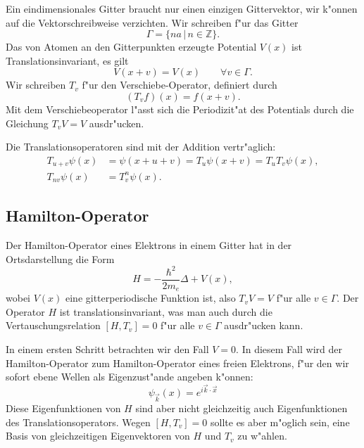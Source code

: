 Ein eindimensionales Gitter braucht nur einen einzigen Gittervektor,
wir k"onnen auf die Vektorschreibweise verzichten.
Wir schreiben f"ur das Gitter
\[
\Gamma=\{ na\,|\,n\in\mathbb Z\}.
\]
Das von Atomen an den Gitterpunkten erzeugte Potential $V(x)$
ist Translationsinvariant, es gilt
\[
V(x+v)=V(x)\qquad\forall v\in\Gamma.
\]
Wir schreiben $T_v$ f"ur den Verschiebe-Operator, definiert durch
\[
(T_vf)(x)=f(x+v).
\]
Mit dem Verschiebeoperator l"asst sich die Periodizit"at des Potentials
durch die Gleichung $T_vV=V$ ausdr"ucken.

Die Translationsoperatoren sind mit der Addition vertr"aglich:
\begin{align*}
T_{u+v}\psi(x)&=\psi(x+u+v)=T_u\psi(x+v)=T_uT_v\psi(x),\\
T_{nv}\psi(x)&=T_v^n\psi(x).
\end{align*}

\subsection{Hamilton-Operator}
Der Hamilton-Operator eines Elektrons in einem Gitter hat in der Ortsdarstellung
die Form
\[
H=-\frac{\hbar^2}{2m_e}\Delta + V(x),
\]
wobei $V(x)$ eine gitterperiodische Funktion ist, also $T_vV=V$ f"ur alle
$v\in\Gamma$.
Der Operator $H$ ist translationsinvariant, was man auch durch
die Vertauschungsrelation $[H,T_v]=0$ f"ur alle $v\in\Gamma$
ausdr"ucken kann.

In einem ersten Schritt betrachten wir den Fall $V=0$.
In diesem Fall wird der Hamilton-Operator zum Hamilton-Operator eines
freien Elektrons, f"ur den wir sofort ebene Wellen als Eigenzust"ande
angeben k"onnen:
\begin{equation}
\psi_{\vec k}(x)=e^{i\vec k\cdot \vec x}
\label{skript:ebenewelle}
\end{equation}
Diese Eigenfunktionen von $H$ sind aber nicht gleichzeitig auch
Eigenfunktionen des Translationsoperators. Wegen $[H,T_v]=0$
sollte es aber m"oglich sein, eine Basis von gleichzeitigen
Eigenvektoren von $H$ und $T_v$ zu w"ahlen.

